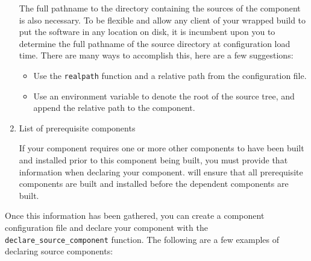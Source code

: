 \begin{enumerate}
  The full pathname to the directory containing the sources of the
  component is also necessary.  To be flexible and allow any client of
  your wrapped build to put the software in any location on disk, it
  is incumbent upon you to determine the full pathname of the source
  directory at configuration load time.  There are many ways to
  accomplish this, here are a few suggestions:

  \begin{itemize}
    \item Use the \gnumake \texttt{realpath} function and a relative path from
      the configuration file.
    \item Use an environment variable to denote the root of the source
      tree, and append the relative path to the component.
  \end{itemize}

\item List of prerequisite components

  If your component requires one or more other components to have been
  built and installed prior to this component being built, you must
  provide that information when declaring your component.  \lmsbw will
  ensure that all prerequisite components are built and installed
  before the dependent components are built.
\end{enumerate}

Once this information has been gathered, you can create a component
configuration file and declare your component with the
\texttt{declare\_source\_component} function.  The following are a few
examples of declaring source components:

